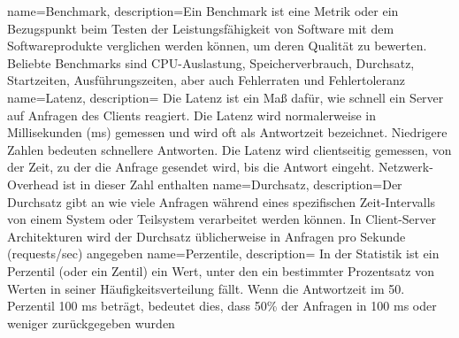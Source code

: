 {
  name=Benchmark,
  description={Ein Benchmark ist eine Metrik oder ein Bezugspunkt beim Testen der Leistungsfähigkeit von Software
      mit dem Softwareprodukte verglichen werden können, um deren Qualität zu bewerten.
      Beliebte Benchmarks sind CPU-Auslastung, Speicherverbrauch, Durchsatz, Startzeiten, Ausführungszeiten,
      aber auch Fehlerraten und Fehlertoleranz}
}
{
  name=Latenz,
  description={
      Die Latenz ist ein Maß dafür, wie schnell ein Server auf Anfragen des Clients reagiert.
      Die Latenz wird normalerweise in Millisekunden (ms) gemessen und wird oft als Antwortzeit bezeichnet.
      Niedrigere Zahlen bedeuten schnellere Antworten. Die Latenz wird clientseitig gemessen, von der
      Zeit, zu der die Anfrage gesendet wird, bis die Antwort eingeht. Netzwerk-Overhead ist in dieser Zahl enthalten}
}
{
  name=Durchsatz,
  description={Der Durchsatz gibt an wie viele Anfragen während eines spezifischen Zeit-Intervalls von einem System oder Teilsystem
      verarbeitet werden können. In Client-Server Architekturen wird der Durchsatz üblicherweise
      in Anfragen pro Sekunde (requests/sec) angegeben}
}
{
  name=Perzentile,
  description=
    {In der Statistik ist ein Perzentil (oder ein Zentil) ein Wert, unter den ein bestimmter Prozentsatz von Werten in seiner Häufigkeitsverteilung fällt.
      Wenn die Antwortzeit im 50. Perzentil 100 ms beträgt, bedeutet dies, dass 50\% der Anfragen in 100 ms oder weniger zurückgegeben wurden}
}
